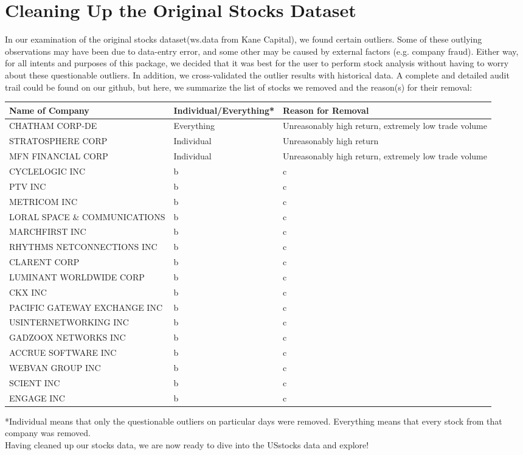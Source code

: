 \section{Cleaning Up the Original Stocks Dataset}

In our examination of the original stocks dataset(ws.data from Kane Capital), we found certain outliers. Some of these outlying observations may have been due to data-entry error, and some other may be caused by external factors (e.g. company fraud). Either way, for all intents and purposes of this package, we decided that it was best for the user to perform stock analysis without having to worry about these questionable outliers. In addition, we cross-validated the outlier results with historical data. A complete and detailed audit trail could be found on our github, but here, we summarize the list of stocks we removed and the reason(s) for their removal: \\


\begin{tabular}{ | p{5cm} | p{4cm} | p{4cm} |}
    \hline
    Name of Company & Individual/Everything* & Reason for Removal \\ \hline
    CHATHAM CORP-DE & Everything & Unreasonably high return, extremely low trade volume \\ \hline
    STRATOSPHERE CORP & Individual & Unreasonably high return \\ \hline
    MFN FINANCIAL CORP & Individual & Unreasonably high return, extremely low trade volume \\ \hline
    CYCLELOGIC INC & b & c \\ \hline
    PTV INC & b & c \\ \hline
    METRICOM INC & b & c \\ \hline
    LORAL SPACE \& COMMUNICATIONS & b & c \\ \hline
    MARCHFIRST INC & b & c \\ \hline
    RHYTHMS NETCONNECTIONS INC & b & c \\ \hline
    CLARENT CORP & b & c \\ \hline
    LUMINANT WORLDWIDE CORP & b & c \\ \hline
    CKX INC & b & c \\ \hline
    PACIFIC GATEWAY EXCHANGE INC & b & c \\ \hline
    USINTERNETWORKING INC & b & c \\ \hline
    GADZOOX NETWORKS INC & b & c \\ \hline
    ACCRUE SOFTWARE INC & b & c \\ \hline
    WEBVAN GROUP INC & b & c \\ \hline
    SCIENT INC & b & c \\ \hline
    ENGAGE INC & b & c \\ 
    \hline
\end{tabular}
*Individual means that only the questionable outliers on particular days were removed. Everything means that every stock from that company was removed. \\
\newline
Having cleaned up our stocks data, we are now ready to dive into the USstocks data and explore!




